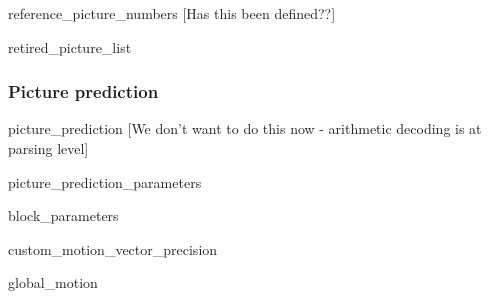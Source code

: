 {\begin{pseudo}{reference\_picture\_numbers}{}
[Has this been defined??]
 \bsEND

\end{pseudo}

\begin{pseudo}{retired\_picture\_list}{}
 \bsEND

\end{pseudo}


\subsubsection{Picture prediction}

\begin{pseudo}{picture\_prediction}{}
\bsITEM{\BlockDataLength]}{unsigned}{}
\bsITEM{\CompressedBlockData]}{chunk}{}[We don't want to do this now - arithmetic decoding is at parsing level]
\end{pseudo}

\begin{pseudo}{picture\_prediction\_parameters}{}
\end{pseudo}

\begin{pseudo}{block\_parameters}{}
\bsIF{\CustomBlockParameters}
  \bsEND
 \bsEND
\end{pseudo}

\begin{pseudo}{custom\_motion\_vector\_precision}{}
\bsIF{\CustomMotionVectorPrecision}
 \bsEND
\end{pseudo}

\begin{pseudo}{global\_motion}{}
\bsIF{\UsingGlobalMotionFlag}
  \bsEND
 \bsEND
\end{pseudo}

}
